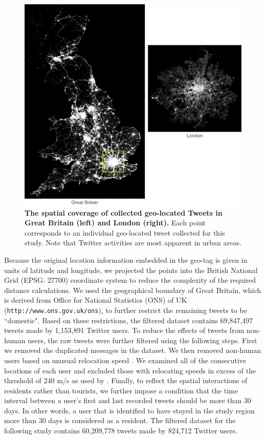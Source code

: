 \documentclass[]{tGIS2e}
\begin{document}
\begin{figure}[ht]
\begin{center}
\includegraphics[width=.8\linewidth]{./figure/S2_twitter_density_Fig_1}
\caption{{\bf The spatial coverage of collected geo-located Tweets in Great Britain (left) and London (right).} Each point corresponds to an individual geo-located tweet collected for this study. Note that Twitter activities are most apparent in urban areas.}
\label{S2_Fig}
\end{center}
\end{figure}
Because the original location information embedded in the geo-tag is given in units of latitude and longitude, we projected the points into the British National Grid (EPSG: 27700) coordinate system to reduce the complexity of the required distance calculations. 
We used the geographical boundary of Great Britain, which is derived from Office for National Statistics (ONS) of UK ({\tt{http://www.ons.gov.uk/ons}}), to further restrict the remaining tweets to be ``domestic".
Based on these restrictions, the filtered dataset contains 69,847,497 tweets made by 1,153,891 Twitter users.
To reduce the effects of tweets from non-human users, the raw tweets were further filtered using the following steps.
First we removed the duplicated messages in the dataset.
We then removed non-human users based on unusual relocation speed \citep{hawelka,jurdak2015}. 
We examined all of the consecutive locations of each user and excluded those with relocating speeds in excess of the threshold of 240 m/s as used by \citep{jurdak2015}.
Finally, to reflect the spatial interactions of residents rather than tourists, we further impose a condition that the time interval between a user's first and last recorded tweets should be more than 30 days.
In other words, a user that is identified to have stayed in the study region more than 30 days is considered as a resident.
The filtered dataset for the following study contains 60,209,778 tweets made by 824,712 Twitter users.
\end{document}
